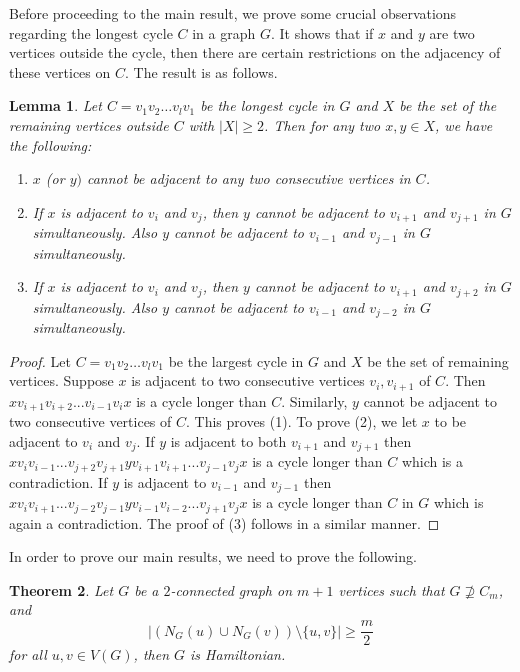 \documentclass[12pt]{article}
\newtheorem{theorem}{Theorem}
\newtheorem{lemma}[theorem]{Lemma}
\theoremstyle{definition}
\begin{document}
Before proceeding to the main result, we prove some crucial observations regarding the longest cycle $C$ in a graph $G$. It shows that if $x$ and $y$ are two vertices outside the cycle, then there are certain restrictions on the adjacency of these vertices on $C$. The result is as follows.

 \begin{lemma}\label{observations}
  Let $C= v_{1}v_{2}\ldots v_{l}v_{1}$ be the longest cycle in $G$ and $X$ be the set of the remaining vertices outside $C$ with $|X|\geq 2$. Then for any two $x,y\in X$, we have the following:
      \begin{enumerate}
         \item $x$ (or $y)$ cannot be adjacent to any two consecutive vertices in $C$.

         \item If $x$ is adjacent to $v_{i}$ and $v_{j}$, then $y$ cannot be adjacent to $v_{i+1}$ and $v_{j+1}$ in $G$ simultaneously. Also $y$ cannot be adjacent to $v_{i-1}$ and $v_{j-1}$ in $G$ simultaneously.

          \item If $x$ is adjacent to $v_{i}$ and $v_{j}$, then $y$ cannot be adjacent to $v_{i+1}$ and $v_{j+2}$ in $G$ simultaneously. Also $y$ cannot be adjacent to $v_{i-1}$ and $v_{j-2}$ in $G$ simultaneously.

      \end{enumerate}
  \end{lemma}

  \begin{proof}
  Let $C=v_{1}v_2\ldots v_lv_1$ be the largest cycle in $G$ and $X$ be the set of remaining vertices. Suppose $x$ is adjacent to two consecutive vertices $v_i,v_{i+1}$ of $C$. Then $xv_{i+1}v_{i+2}...v_{i-1}v_ix$ is a cycle longer than $C$. Similarly, $y$ cannot be adjacent to two consecutive vertices of $C$. This proves (1). To prove (2), we let $x$ to be adjacent to $v_{i}$ and $v_{j}$. If $y$ is adjacent to both $v_{i+1}$ and $v_{j+1}$ then $xv_iv_{i-1}...v_{j+2}v_{j+1}yv_{i+1}v_{i+1}...v_{j-1}v_jx$ is a cycle longer than $C$ which is a contradiction. If $y$ is adjacent to $v_{i-1}$ and $v_{j-1}$ then $xv_iv_{i+1}...v_{j-2}v_{j-1}yv_{i-1}v_{i-2}...v_{j+1}v_jx$ is a cycle longer than $C$ in $G$ which is again a contradiction. The proof of (3)  follows in a similar manner. \end{proof}
In order to prove our main results, we need to prove the following.
\begin{theorem}\label{Hamiltonian lemma}
    Let $G$ be a $2$-connected graph on $m+1$ vertices such that $ G\nsupseteq C_{m}$, and
    \begin{equation*}
        |(N_{G}(u)\cup N_{G}(v))\setminus\{u,v\}|\geq \frac{m}{2}
    \end{equation*}
    for all $u,v\in V(G)$, then $G$ is Hamiltonian. 
\end{theorem}
\end{document}
